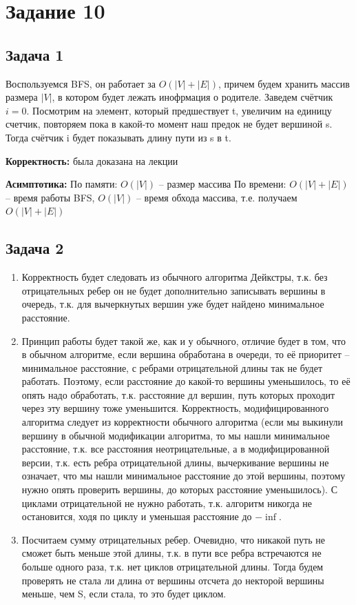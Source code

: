 \documentclass[a4paper,14pt]{article} %
\begin{document}

\section{Задание 10}
\subsection{Задача 1}
Воспользуемся BFS, он работает за $O(|V| + |E|)$, причем будем хранить массив размера $|V|$, в котором будет лежать инофрмация о родителе. 
Заведем счётчик $i = 0$. Посмотрим на элемент, который предшествует t, увеличим на единицу счетчик, повторяем пока в какой-то момент наш предок не будет вершиной s.
Тогда счётчик i будет показывать длину пути из s в t. 

\textbf{Корректность:} была доказана на лекции 

\textbf{Асимптотика:}
\newline
По памяти: $O(|V|)$ -- размер массива
\newline
По времени: $O(|V| + |E|)$ -- время работы BFS, $O(|V|)$ -- время обхода массива, т.е. получаем $O(|V| + |E|)$

\subsection{Задача 2}

\begin{enumerate}
	\item Корректность будет следовать из обычного алгоритма Дейкстры, т.к. без отрицательных ребер он не будет дополнительно записывать вершины в очередь,
	т.к. для вычеркнутых вершин уже будет найдено минимальное расстояние.
	\item Принцип работы будет такой же, как и у обычного, отличие будет в том, что в обычном алгоритме, если вершина обработана в очереди, то её приоритет
	-- минимальное расстояние, с ребрами отрицательной длины так не будет работать. Поэтому, если расстояние до какой-то вершины уменьшилось, то её опять надо обработать, т.к.
	расстояние дл вершин, путь которых проходит через эту вершину тоже уменьшится. Корректность, модифицированного алгоритма следует из корректности обычного алгоритма
	(если мы выкинули вершину в обычной модификации алгоритма, то мы нашли минимальное расстояние, т.к. все расстояния неотрицательные,  а в модифицированной версии, т.к. есть ребра отрицательной длины, вычеркивание вершины
	не означает, что мы нашли минимальное расстояние до этой вершины, поэтому нужно опять проверить вершины, до которых расстояние уменьшилось). С циклами отрицательной не нужно работать, т.к. алгоритм никогда не остановится,
	ходя по циклу и уменьшая расстояние до $-\inf$.
	\item Посчитаем сумму отрицательных ребер. Очевидно, что никакой путь не сможет быть меньше этой длины, т.к. в пути все ребра встречаются не больше одного раза, т.к. нет циклов отрицательной длины.
	Тогда будем проверять не стала ли длина от вершины отсчета до некторой вершины меньше, чем S, если стала, то это будет циклом.
\end{enumerate}
\end{document}
